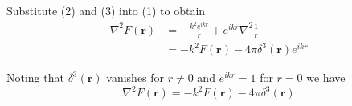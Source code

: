 Substitute (2) and (3) into (1) to obtain
\begin{align*}
\nabla^2F(\mathbf r)&=-\frac{k^2e^{ikr}}{r}+e^{ikr}\nabla^2\frac{1}{r}
\\
&=-k^2F(\mathbf r)-4\pi\delta^3(\mathbf r)e^{ikr}
\end{align*}

Noting that $\delta^3(\mathbf r)$ vanishes for $r\ne0$ and $e^{ikr}=1$ for $r=0$ we have
\begin{equation*}
\nabla^2F(\mathbf r)=-k^2F(\mathbf r)-4\pi\delta^3(\mathbf r)\tag{4}
\end{equation*}


